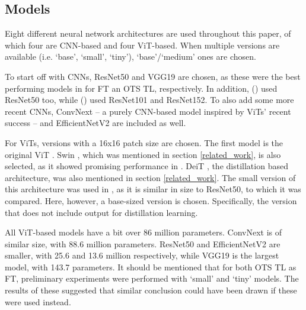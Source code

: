 \subsection{Models}
Eight different neural network architectures are used throughout this paper, of which four are CNN-based and four ViT-based. When multiple versions are available (i.e. `base', `small', `tiny'), `base'/`medium' ones are chosen.

To start off with CNNs, ResNet50 \citep{he2016deep} and VGG19 \citep{simonyan2014very} are chosen, as these were the best performing models in \citeauthor{sabatelli2018deep} for FT an OTS TL, respectively. In addition, \citeauthor{matsoukas2021time} (\citeyear{matsoukas2021time}) used ResNet50 too, while \citeauthor{zhou2021convnets} (\citeyear{zhou2021convnets}) used ResNet101 and ResNet152. To also add some more recent CNNs, ConvNext \citep{liu2022convnet} -- a purely CNN-based model inspired by ViTs' recent success -- and EfficientNetV2 \citep{tan2021efficientnetv2} are included as well.

For ViTs, versions with a 16x16 patch size are chosen. The first model is the original ViT \citep{dosovitskiy2020image}. Swin \citep{liu2021swin}, which was mentioned in section \ref{related_work}, is also selected, as it showed promising performance in \citeauthor{zhou2021convnets}. DeiT \citep{touvron2021training}, the distillation based architecture, was also mentioned in section \ref{related_work}. The small version of this architecture was used in \citeauthor{matsoukas2021time}, as it is similar in size to ResNet50, to which it was compared. Here, however, a base-sized version is chosen. Specifically, the version that does not include output for distillation learning.

All ViT-based models have a bit over 86 million parameters. ConvNext is of similar size, with 88.6 million parameters. ResNet50 and EfficientNetV2 are smaller, with 25.6 and 13.6 million respectively, while VGG19 is the largest model, with 143.7 parameters. It should be mentioned that for both OTS TL as FT, preliminary experiments were performed with `small' and `tiny' models. The results of these suggested that similar conclusion could have been drawn if these were used instead.


